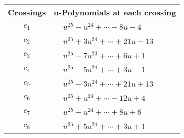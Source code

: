 \documentclass[1p]{elsarticle_modified}
\theoremstyle{definition}
\begin{document}
\begin{tabular}{m{50pt}|m{274pt}}
Crossings & \hspace{64pt}u-Polynomials at each crossing \\
\hline $$\begin{aligned}c_{1}\end{aligned}$$&$\begin{aligned}
&u^{25}- u^{24}+\cdots-8 u-4
\end{aligned}$\\
\hline $$\begin{aligned}c_{2}\end{aligned}$$&$\begin{aligned}
&u^{25}+3 u^{24}+\cdots+21 u-13
\end{aligned}$\\
\hline $$\begin{aligned}c_{3}\end{aligned}$$&$\begin{aligned}
&u^{25}-7 u^{23}+\cdots+6 u+1
\end{aligned}$\\
\hline $$\begin{aligned}c_{4}\end{aligned}$$&$\begin{aligned}
&u^{25}-5 u^{24}+\cdots+3 u-1
\end{aligned}$\\
\hline $$\begin{aligned}c_{5}\end{aligned}$$&$\begin{aligned}
&u^{25}-3 u^{24}+\cdots+21 u+13
\end{aligned}$\\
\hline $$\begin{aligned}c_{6}\end{aligned}$$&$\begin{aligned}
&u^{25}+u^{24}+\cdots-12 u+4
\end{aligned}$\\
\hline $$\begin{aligned}c_{7}\end{aligned}$$&$\begin{aligned}
&u^{25}- u^{24}+\cdots+8 u+8
\end{aligned}$\\
\hline $$\begin{aligned}c_{8}\end{aligned}$$&$\begin{aligned}
&u^{25}+5 u^{24}+\cdots+3 u+1
\end{aligned}$\\

\end{tabular}
\end{document}
